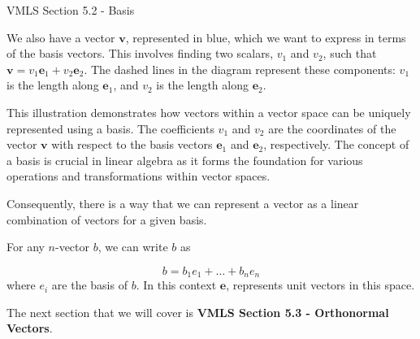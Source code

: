 \begin{notes}{VMLS Section 5.2 - Basis}
\begin{highlight}
        We also have a vector $\mathbf{v}$, represented in blue, which we want to express in terms of the basis vectors. This involves finding two scalars, $v_1$ and $v_2$, such that $\mathbf{v} = v_1\mathbf{e}_1 
        + v_2\mathbf{e}_2$. The dashed lines in the diagram represent these components: $v_1$ is the length along $\mathbf{e}_1$, and $v_2$ is the length along $\mathbf{e}_2$.

        This illustration demonstrates how vectors within a vector space can be uniquely represented using a basis. The coefficients $v_1$ and $v_2$ are the coordinates of the vector $\mathbf{v}$ with respect 
        to the basis vectors $\mathbf{e}_1$ and $\mathbf{e}_2$, respectively. The concept of a basis is crucial in linear algebra as it forms the foundation for various operations and transformations within 
        vector spaces.
    \end{highlight}

    Consequently, there is a way that we can represent a vector as a linear combination of vectors for a given basis.

    \begin{highlight}
        For any $n$-vector $b$, we can write $b$ as 

        \begin{equation*}
            b = b_{1}e_{1} + \dots + b_{n}e_{n}
        \end{equation*}
        where $e_{i}$ are the basis of $b$. In this context $\mathbf{e}$, represents unit vectors in this space.
    \end{highlight}
\end{notes}

The next section that we will cover is \textbf{VMLS Section 5.3 - Orthonormal Vectors}.


